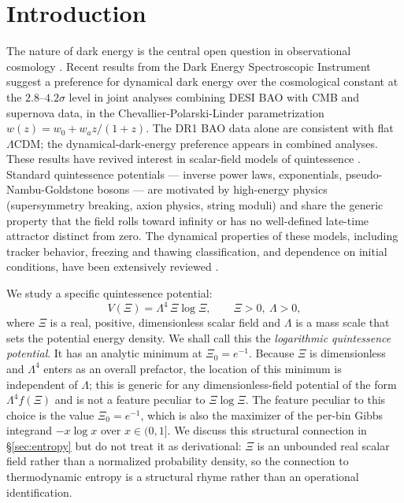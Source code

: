 \documentclass[11pt,reqno]{amsart}
\theoremstyle{plain}
\theoremstyle{definition}
\theoremstyle{remark}
\begin{document}
\maketitle

\section{Introduction}

The nature of dark energy is the central open question in observational
cosmology \cite{SahniStarobinsky2000,Padmanabhan2003,PeeblesRatra2003,FriemanTurnerHuterer2008,JoyceJainKhouryTrodden2015}.
Recent results from the Dark Energy Spectroscopic Instrument
\cite{DESI2024BAO,DESI2024VI} suggest a preference for dynamical dark energy
over the cosmological constant at the $2.8$--$4.2\sigma$ level in joint
analyses combining DESI BAO with CMB and supernova data, in the
Chevallier-Polarski-Linder \cite{CPL2001,Linder2003} parametrization
$w(z) = w_0 + w_a z/(1+z)$. The DR1 BAO data alone are consistent with flat
$\Lambda$CDM; the dynamical-dark-energy preference appears in combined
analyses. These results have revived interest in scalar-field models of
quintessence \cite{RatraPeebles1988,Wetterich1988,Frieman1995,CaldwellDaveSteinhardt1998,SteinhardtWangZlatev1999,ZlatevWangSteinhardt1999}.
Standard quintessence potentials --- inverse power laws, exponentials,
pseudo-Nambu-Goldstone bosons --- are motivated by high-energy physics
(supersymmetry breaking, axion physics, string moduli) and share the
generic property that the field rolls toward infinity or has no
well-defined late-time attractor distinct from zero. The dynamical
properties of these models, including tracker behavior, freezing and
thawing classification, and dependence on initial conditions, have been
extensively reviewed \cite{CopelandSamiTsujikawa2006,Tsujikawa2013}.

We study a specific quintessence potential:
\begin{equation}\label{eq:Vxi}
  V(\Xi) = \Lambda^{4}\,\Xi\log\Xi,
  \qquad \Xi > 0,\ \Lambda > 0,
\end{equation}
where $\Xi$ is a real, positive, dimensionless scalar field and $\Lambda$ is
a mass scale that sets the potential energy density. We shall call this the
\emph{logarithmic quintessence potential}. It has an analytic minimum at
$\Xi_0 = e^{-1}$. Because $\Xi$ is dimensionless and $\Lambda^{4}$ enters
as an overall prefactor, the location of this minimum is independent of
$\Lambda$; this is generic for any dimensionless-field potential of the
form $\Lambda^{4} f(\Xi)$ and is not a feature peculiar to $\Xi\log\Xi$.
The feature peculiar to this choice is the value $\Xi_0 = e^{-1}$, which
is also the maximizer of the per-bin Gibbs integrand $-x\log x$ over
$x \in (0,1]$. We discuss this structural connection in
\S\ref{sec:entropy} but do not treat it as derivational: $\Xi$ is an
unbounded real scalar field rather than a normalized probability density,
so the connection to thermodynamic entropy is a structural rhyme rather
than an operational identification.
\end{document}
